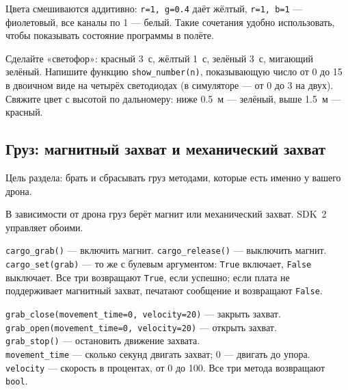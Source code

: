 Цвета смешиваются аддитивно: \verb|r=1, g=0.4| даёт жёлтый, \verb|r=1, b=1| --- фиолетовый, все каналы по 1 --- белый. Такие сочетания удобно использовать, чтобы показывать состояние программы в полёте.

\begin{taskbox}
Сделайте «светофор»: красный 3~с, жёлтый 1~с, зелёный 3~с, мигающий зелёный. Напишите функцию \verb|show_number(n)|, показывающую число от 0 до 15 в двоичном виде на четырёх светодиодах (в симуляторе --- от 0 до 3 на двух). Свяжите цвет с высотой по дальномеру: ниже 0.5~м --- зелёный, выше 1.5~м --- красный.
\end{taskbox}

\subsection{Груз: магнитный захват и механический захват}

Цель раздела: брать и сбрасывать груз методами, которые есть именно у вашего дрона.

В зависимости от дрона груз берёт магнит или механический захват. SDK~2 управляет обоими.

\begin{codebox}
\verb|cargo_grab()| --- включить магнит. \verb|cargo_release()| --- выключить магнит. \verb|cargo_set(grab)| --- то же с булевым аргументом: \verb|True| включает, \verb|False| выключает. Все три возвращают \verb|True|, если успешно; если плата не поддерживает магнитный захват, печатают сообщение и возвращают \verb|False|.
\end{codebox}

\begin{codebox}
\verb|grab_close(movement_time=0, velocity=20)| --- закрыть захват.\\
\verb|grab_open(movement_time=0, velocity=20)| --- открыть захват.\\
\verb|grab_stop()| --- остановить движение захвата.\\
\verb|movement_time| --- сколько секунд двигать захват; 0 --- двигать до упора. \verb|velocity| --- скорость в процентах, от 0 до 100. Все три метода возвращают \verb|bool|.
\end{codebox}

